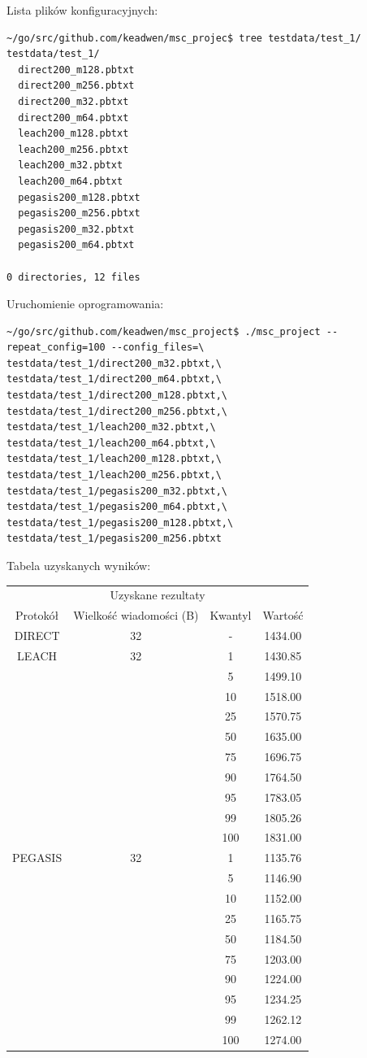 \documentclass[a4paper,12pt,twoside,openany]{report}
\begin{document}
Lista plików konfiguracyjnych:

\begin{lstlisting}
~/go/src/github.com/keadwen/msc_projec$ tree testdata/test_1/
testdata/test_1/
  direct200_m128.pbtxt
  direct200_m256.pbtxt
  direct200_m32.pbtxt
  direct200_m64.pbtxt
  leach200_m128.pbtxt
  leach200_m256.pbtxt
  leach200_m32.pbtxt
  leach200_m64.pbtxt
  pegasis200_m128.pbtxt
  pegasis200_m256.pbtxt
  pegasis200_m32.pbtxt
  pegasis200_m64.pbtxt

0 directories, 12 files
\end{lstlisting}


Uruchomienie oprogramowania:

\begin{lstlisting}
~/go/src/github.com/keadwen/msc_project$ ./msc_project --repeat_config=100 --config_files=\
testdata/test_1/direct200_m32.pbtxt,\
testdata/test_1/direct200_m64.pbtxt,\
testdata/test_1/direct200_m128.pbtxt,\
testdata/test_1/direct200_m256.pbtxt,\
testdata/test_1/leach200_m32.pbtxt,\
testdata/test_1/leach200_m64.pbtxt,\
testdata/test_1/leach200_m128.pbtxt,\
testdata/test_1/leach200_m256.pbtxt,\
testdata/test_1/pegasis200_m32.pbtxt,\
testdata/test_1/pegasis200_m64.pbtxt,\
testdata/test_1/pegasis200_m128.pbtxt,\
testdata/test_1/pegasis200_m256.pbtxt
\end{lstlisting}

Tabela uzyskanych wyników:

\begin{longtable}{*{4}{c}}
\toprule
\multicolumn{4}{c}{Uzyskane rezultaty} \\
Protokół	& Wielkość wiadomości (B)	& Kwantyl	& Wartość \\
\midrule
\endhead
DIRECT	& 32 	& -	& 1434.00 \\*
\midrule
LEACH	& 32	& 1	& 1430.85 \\*
	&	& 5	& 1499.10 \\*
	&	& 10	& 1518.00 \\*
	&	& 25	& 1570.75 \\*
	&	& 50	& 1635.00 \\*
	&	& 75	& 1696.75 \\*
	&	& 90	& 1764.50 \\*
	&	& 95	& 1783.05 \\*
	&	& 99	& 1805.26 \\*
	&	& 100	& 1831.00 \\*
\midrule
PEGASIS	& 32	& 1	& 1135.76 \\*
	&	& 5	& 1146.90 \\*
	&	& 10	& 1152.00 \\*
	&	& 25	& 1165.75 \\*
	&	& 50	& 1184.50 \\*
	&	& 75	& 1203.00 \\*
	&	& 90	& 1224.00 \\*
	&	& 95	& 1234.25 \\*
	&	& 99	& 1262.12 \\*
	&	& 100	& 1274.00 \\*
\bottomrule
\end{longtable}
\end{document}
